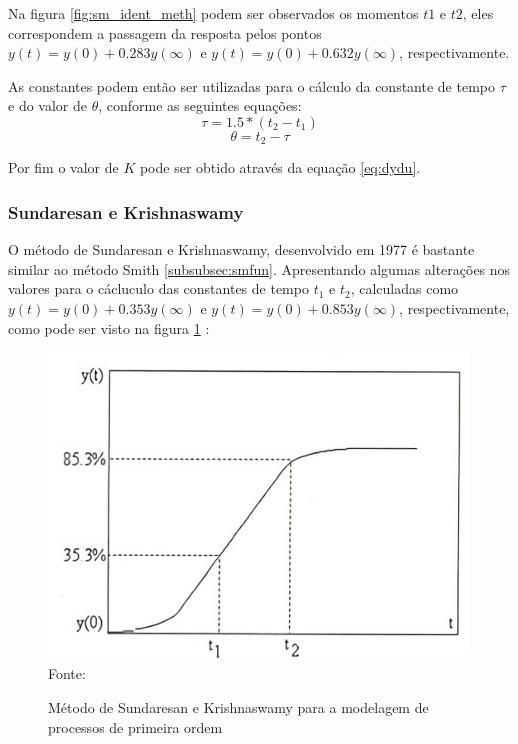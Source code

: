 Na figura \ref{fig:sm_ident_meth} podem ser observados os momentos $t1$ e $t2$, eles correspondem a passagem da resposta
pelos pontos $y(t) = y(0) + 0.283y(\infty)$ e $y(t) = y(0) + 0.632y(\infty)$, respectivamente.

As constantes podem então ser utilizadas para o cálculo da constante de tempo $\tau$ e do valor de $\theta$,
conforme as seguintes equações:
\begin{equation}
    \label{eq:smtau}
    \tau = 1.5*(t_2 - t_1)
\end{equation}
\begin{equation}
    \label{eq:smtheta}
    \theta = t_2 - \tau
\end{equation}

Por fim o valor de $K$ pode ser obtido através da equação \eqref{eq:dydu}.

\subsubsection{Sundaresan e Krishnaswamy}\label{subsubsec:skfun}

O método de Sundaresan e Krishnaswamy, desenvolvido em 1977 é bastante similar ao método Smith \ref{subsubsec:smfun}.
Apresentando algumas alterações nos valores para o cácluculo das constantes de tempo $t_1$ e $t_2$, calculadas como
$y(t) = y(0) + 0.353y(\infty)$ e $y(t) = y(0) + 0.853y(\infty)$, respectivamente, como pode ser visto na figura
\ref{fig:sd_kr_ident_meth} \cite{CoelhoIdentificacao}:


\begin{figure}[H]
    \centering
    \caption{Método de Sundaresan e Krishnaswamy para a modelagem de processos de primeira ordem }
    \includegraphics[scale=0.3]{figuras/sd_kr_ident_meth}
    \label{fig:sd_kr_ident_meth}
    \\
    \vspace{0cm}\hspace{0cm}\small{Fonte: \cite{CoelhoIdentificacao}}
\end{figure}

